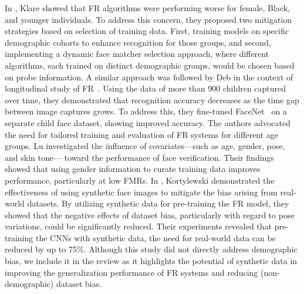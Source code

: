 In \cite{klare2012face}, Klare \etal showed that FR algorithms were performing
worse for female, Black, and younger individuals. To address this concern, they
proposed two mitigation strategies based on selection of training
data. First, training models on specific demographic cohorts to enhance
recognition for those groups, and second, implementing a dynamic face matcher
selection approach, where different algorithms, each trained on distinct
demographic groups, would be chosen based on probe information.  A similar
approach was followed by Deb \etal in the context of longitudinal study of
FR~\cite{deb2018longitudinal}.  Using the data of more than 900 children
captured over time, they demonstrated that recognition accuracy decreases as
the time gap between image captures grows. To address this, they fine-tuned
FaceNet~\cite{schroff2015facenet} on a separate child face dataset, showing
improved accuracy.  The authors advocated the need for tailored training and
evaluation of FR systems for different age groups. Lu \etal
\cite{lu2019experimental} investigated the influence of covariates—such as age,
gender, pose, and skin tone— toward the performance of face verification.
Their findings showed that using gender information to curate training data
improves performance, particularly at low FMRs.
%
In \cite{kortylewski2019analyzing}, Kortylewski \etal demonstrated the
effectiveness of using synthetic face images to mitigate the bias arising from
real-world datasets. By utilizing synthetic data for pre-training the FR model,
they showed that the negative effects of dataset bias, particularly with regard
to pose variations, could be significantly reduced. Their experiments revealed
that pre-training the CNNs with synthetic data, the need for real-world data
can be reduced by up to 75\%. Although this study did not directly address
demographic bias, we include it in the review as it highlights the potential of
synthetic data in improving the generalization performance of FR systems and
reducing (non-demographic) dataset bias.


